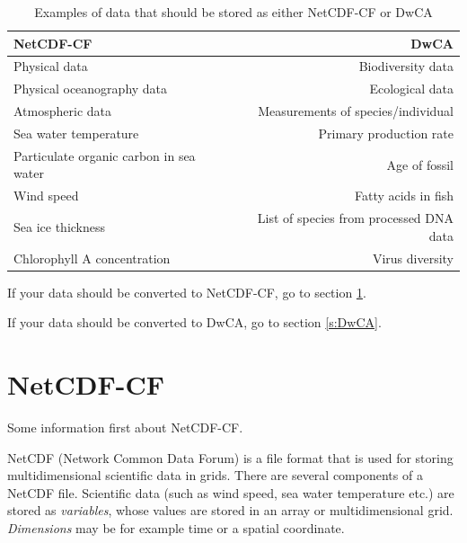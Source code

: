 \documentclass[a4paper,english, 11pt]{article}
\makeatletter
\newcommand{\emailme}{\href{mailto:data.nleg@unis.no}{data.nleg@unis.no}}
\makeatother
\begin{document}
\begin{table}[h!]
  \begin{center}
    \label{t:netcdf_vs_dwca}
    \begin{tabular}{l|r} %
      \textbf{NetCDF-CF} & \textbf{DwCA}\\
      \hline
      Physical data & Biodiversity data\\
      Physical oceanography data & Ecological data\\
      Atmospheric data & Measurements of species/individual\\
      Sea water temperature & Primary production rate\\
      Particulate organic carbon in sea water & Age of fossil\\
      Wind speed & Fatty acids in fish\\
      Sea ice thickness & List of species from processed DNA data\\
      Chlorophyll A concentration & Virus diversity\\
      
    \end{tabular}
    \caption{Examples of data that should be stored as either NetCDF-CF or DwCA}
  \end{center}
\end{table}


If your data should be converted to NetCDF-CF, go to section \ref{s:NetCDF-CF}.

If your data should be converted to DwCA, go to section \ref{s:DwCA}.

\newpage
\section{NetCDF-CF}
\label{s:NetCDF-CF}

Some information first about NetCDF-CF. 

NetCDF (Network Common Data Forum) is a file format that is used for storing multidimensional scientific data in grids. There are several components of a NetCDF file. Scientific data (such as wind speed, sea water temperature etc.) are stored as \textit{variables}, whose values are stored in an array or multidimensional grid. \textit{Dimensions} may be for example time or a spatial coordinate.
\end{document}
